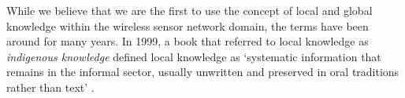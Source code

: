 While we believe that we are the first to use the concept of local and global knowledge within the wireless sensor network domain, the terms have been around for many years. In 1999, a book that referred to local knowledge as \textit{indigenous knowledge} defined local knowledge as ‘systematic information that remains in the informal sector, usually unwritten and preserved in oral traditions rather than text’ \cite{LadislausM.Semali}. 

